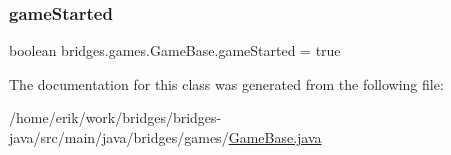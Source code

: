 \subsubsection{\texorpdfstring{game\+Started}{gameStarted}}
{\footnotesize\ttfamily boolean bridges.\+games.\+Game\+Base.\+game\+Started = true\hspace{0.3cm}{\ttfamily [protected]}}



The documentation for this class was generated from the following file\+:\begin{DoxyCompactItemize}
\item 
/home/erik/work/bridges/bridges-\/java/src/main/java/bridges/games/\hyperlink{_game_base_8java}{Game\+Base.\+java}\end{DoxyCompactItemize}

